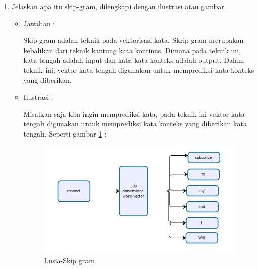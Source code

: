 \begin{enumerate}
\begin{itemize}
	\end{itemize}

\item Jelaskan apa itu skip-gram, dilengkapi dengan ilustrasi atau gambar.
	\begin{itemize}
	\item Jawaban :
		\par Skip-gram adalah teknik pada vektorisasi kata. Skrip-gram merupakan kebalikan dari teknik kantung kata kontinus. Dimana pada teknik ini, kata tengah adalah input dan kata-kata konteks adalah output. Dalam teknik ini, vektor kata tengah digunakan untuk memprediksi kata konteks yang diberikan. 

	\item Ilustrasi :
		\par Misalkan saja kita ingin memprediksi kata, pada teknik ini vektor kata tengah digunakan untuk memprediksi kata konteks yang diberikan kata tengah. Seperti gambar \ref{5a8} : 
			\begin{figure}[ht]
			\centering
			\includegraphics[scale=0.5]{figures/p6.jpg}
			\caption{Lusia-Skip gram}
			\label{5a8}
			\end{figure}
	
	\end{itemize}

\end{enumerate}

